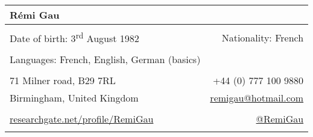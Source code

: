 \documentclass[a4paper,12pt,oneside]{letter}
\date{2017-01-11}
\begin{document}
\newcommand{\myheader}{
\begin{tabular*}{7in}{l@{\extracolsep{\fill}}r}

	\textbf{{\LARGE Rémi Gau}}  & \\
	\hline\hline	\\
	Date of birth: 3\textsuperscript{rd} August 1982 & Nationality: French\\
	\\
	Languages: French, English, German (basics)\\
	\\
	71 Milner road, B29 7RL & +44 (0) 777 100 9880 \\
	Birmingham, United Kingdom & \href{mailto:remi\textunderscore gau@hotmail.com}{remi\textunderscore gau@hotmail.com} \\
	\\
	\href{http://www.researchgate.net/profile/Remi\textunderscore Gau}{researchgate.net/profile/Remi\textunderscore Gau} & \href{http://www.twitter.com/RemiGau}{@RemiGau} \\
	\\
	\hline\hline
	\end{tabular*}}

\myheader

\setlength\minrowclearance{0.2cm}
\setlength\arrayrulewidth{2pt}
\end{document}
